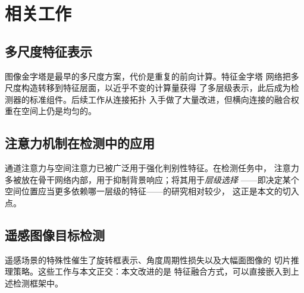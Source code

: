 \section{相关工作}
\label{sec:related}

\subsection{多尺度特征表示}
\label{sec:related:multiscale}

图像金字塔是最早的多尺度方案，代价是重复的前向计算。特征金字塔
网络\cite{lin2017fpn}把多尺度构造转移到特征层面，以近乎不变的计算量获得
了多层级表示，此后成为检测器的标准组件。后续工作从连接拓扑
入手做了大量改进，但横向连接的融合权重在空间上仍是均匀的。

\subsection{注意力机制在检测中的应用}
\label{sec:related:attention}

通道注意力与空间注意力已被广泛用于强化判别性特征。在检测任务中，
注意力多被放在骨干网络内部，用于抑制背景响应；将其用于\emph{层级选择}
——即决定某个空间位置应当更多依赖哪一层级的特征——的研究相对较少，
这正是本文的切入点。

\subsection{遥感图像目标检测}
\label{sec:related:rsdet}

遥感场景的特殊性催生了旋转框表示、角度周期性损失以及大幅面图像的
切片推理策略\cite{wang2021remote}。这些工作与本文正交：本文改进的是
特征融合方式，可以直接嵌入到上述检测框架中。
